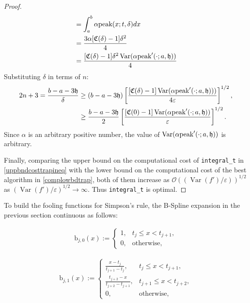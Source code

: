 \documentclass{iitthesis}
\DeclareMathOperator{\Var}{Var}
\theoremstyle{definition}
\theoremstyle{remark}
\begin{document}
\begin{proof}
\begin{subequations}
\begin{align*}
     &=\int_{a}^{b}\alpha\textup{peak}(x;t,\delta)dx\\
     &=\frac{3\alpha[\mathfrak{C}(\delta)-1]\delta^2}{4}\\
     &=\frac{[\mathfrak{C}(\delta)-1]\delta^2\Var(\alpha\textup{peak}'(\cdot;a,\mathfrak{h}))}{4}
  \end{align*}
  \end{subequations}
  Substituting $\delta$  in terms of $n$:
      \begin{align*}
        2n+3=\frac{b-a-3\mathfrak{h}}{\delta}&\ge(b-a-3\mathfrak{h})\left[\frac{[\mathfrak{C}(\delta)-1]\Var(\alpha \textup{peak}'(\cdot;a,\mathfrak{h})))}{4\varepsilon}\right]^{1/2},\\
        &\ge\frac{b-a-3\mathfrak{h}}{2}\left[\frac{[\mathfrak{C}(0)-1]\Var(\alpha \textup{peak}'(\cdot;a,\mathfrak{h}))}{\varepsilon}\right]^{1/2}.
    \end{align*}
    Since $\alpha$ is an arbitrary positive number, the value of $\Var(\alpha \textup{peak}'(\cdot;a,\mathfrak{h}))$ is arbitrary.

    Finally, comparing the upper bound on the computational cost of {\tt integral\_t} in \eqref{uppbndcosttrapineq} with the lower bound on the computational cost of the best algorithm in \eqref{complowbdtrap}, both of them increase as $\mathcal{O}((\Var(f')/\varepsilon))^{1/2}$ as $(\Var(f')/\varepsilon)^{1/2}\rightarrow \infty$. Thus {\tt integral\_t} is optimal.
\end{proof}


To build the fooling functions for Simpson's rule, the B-Spline expansion in the previous section continuous as follows:

\begin{align*}
  \text{b}_{j,0}(x):= \begin{cases} \displaystyle 1, & t_{j} \le x < t_{j+1},\\[1ex]
\displaystyle  0, & \text{otherwise},
\end{cases}
\end{align*}

\begin{align*}
  \text{b}_{j,1}(x):= \begin{cases} \displaystyle \frac{x-t_{j}}{t_{j+1}-t_{j}}, & t_{j} \le x < t_{j+1},\\[1ex]
\displaystyle \frac{t_{j+2}-x}{t_{j+2}-t_{j+1}}, & t_{j+1} \le x < t_{j+2},\\[1ex]
\displaystyle  0, & \text{otherwise},
\end{cases}
\end{align*}
\end{document}
